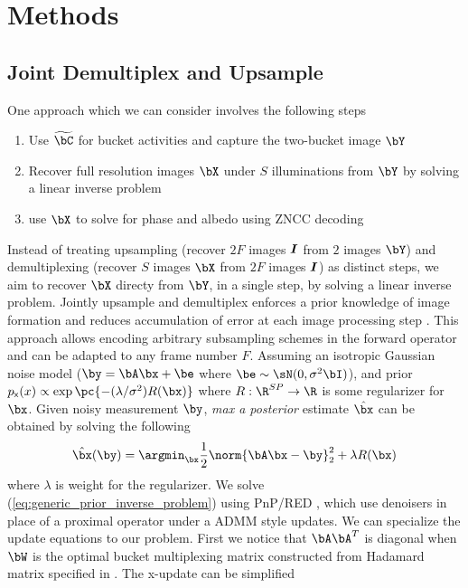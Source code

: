 \documentclass[../writeup.tex]{subfiles}
\begin{document}
  


\section{Methods}


\subsection{Joint Demultiplex and Upsample}

One approach which we can consider involves the following steps
\begin{enumerate}
    \item Use $\widetilde{\bC}$ for bucket activities and capture the two-bucket image $\bY$
    \item Recover full resolution images $\bX$ under $S$ illuminations from $\bY$ by solving a linear inverse problem
    \item use $\bX$ to solve for phase and albedo using ZNCC decoding \cite{mirdehghanOptimalStructuredLight2018}
\end{enumerate}
Instead of treating upsampling (recover $2F$ images $\boldsymbol{I}$ from $2$ images $\bY$) and demultiplexing (recover $S$ images $\bX$ from $2F$ images $\boldsymbol{I}$) as distinct steps, we aim to recover $\bX$ directy from $\bY$, in a single step, by solving a linear inverse problem. Jointly upsample and demultiplex enforces a prior knowledge of image formation and reduces accumulation of error at each image processing step \cite{heideFlexISPFlexibleCamera2014}. This approach allows encoding arbitrary subsampling schemes in the forward operator and can be adapted to any frame number $F$. Assuming an isotropic Gaussian noise model ($\by=\bA\bx + \be$ where $\be\sim \sN(0,\sigma^2 \bI)$), and prior $p_{\rx}(x) \propto \exp\pc{- (\lambda/\sigma^2) R(\bx) }$ where $R:\R^{SP}\to\R$ is some regularizer for $\bx$. Given noisy measurement $\by$, \textit{max a posterior} estimate $\hat{\bx}$ can be obtained by solving the following
\begin{align}
    \hat{\bx}(\by)
        = \argmin_{\bx}
        \frac{1}{2} \norm{\bA\bx-\by}_2^2 + \lambda R(\bx)
    \label{eq:generic_prior_inverse_problem}
\end{align}
where $\lambda$ is weight for the regularizer. We solve (\ref{eq:generic_prior_inverse_problem}) using PnP/RED \cite{venkatakrishnanPlugandPlayPriorsModel2013,romanoLittleEngineThat2016}, which use denoisers in place of a proximal operator under a ADMM style updates. We can specialize the update equations to our problem. First we notice that $\bA\bA^T$ is diagonal when $\bW$ is the optimal bucket multiplexing matrix constructed from Hadamard matrix specified in \cite{weiCodedTwoBucketCameras2018}. The x-update can be simplified  \cite{liuRankMinimizationSnapshot2019} 
\end{document}
